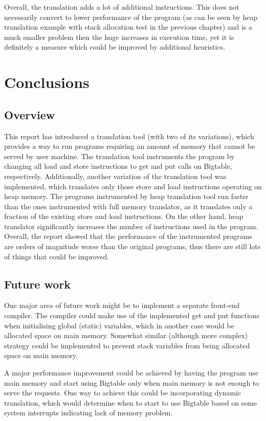 \documentclass[bsc,frontabs,twoside,singlespacing,parskip,deptreport]{infthesis}     %
\begin{document}
Overall, the translation adds a lot of additional instructions. This does not necessarily convert to lower performance of the program (as can be seen by heap translation example with stack allocation test in the previous chapter) and is a much smaller problem then the huge increases in execution time, yet it is definitely a measure which could be improved by additional heuristics.

\chapter{Conclusions}

\section{Overview}

This report has introduced a translation tool (with two of its variations), which provides a way to run programs requiring an amount of memory that cannot be served by user machine. The translation tool instruments the program by changing all load and store instructions to get and put calls on Bigtable, respectively. Additionally, another variation of the translation tool was implemented, which translates only those store and load instructions operating on heap memory. The programs instrumented by heap translation tool run faster than the ones instrumented with full memory translator, as it translates only a fraction of the existing store and load instructions. On the other hand, heap translator significantly increases the number of instructions used in the program. Overall, the report showed that the performance of the instrumented programs are orders of magnitude worse than the original programs, thus there are still lots of things that could be improved.

\section{Future work}

One major area of future work might be to implement a separate front-end compiler. The compiler could make use of the implemented get and put functions when initialising global (static) variables, which in another case would be allocated space on main memory. Somewhat similar (although more complex) strategy could be implemented to prevent stack variables from being allocated space on main memory.

A major performance improvement could be achieved by having the program use main memory and start using Bigtable only when main memory is not enough to serve the requests. One way to achieve this could be incorporating dynamic translation, which would determine when to start to use Bigtable based on some system interrupts indicating lack of memory problem. 
\end{document}
